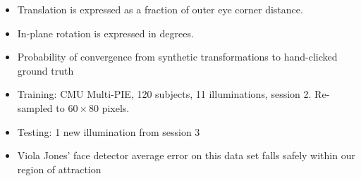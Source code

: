 {\begin{center}
\end{center}
\vspace{0mm}
{\tiny
\begin{itemize}
\item Translation is expressed as a fraction of outer eye corner distance.
\item In-plane rotation is expressed in degrees. 
\item Probability of convergence from synthetic transformations to hand-clicked ground truth
\item Training: CMU Multi-PIE, 120 subjects, 11 illuminations, session 2.  Re-sampled to $60 \times 80$ pixels.
\item Testing: 1 new illumination from session 3
\item Viola Jones' face detector average error on this data set falls safely within our region of attraction
\end{itemize}}
}





